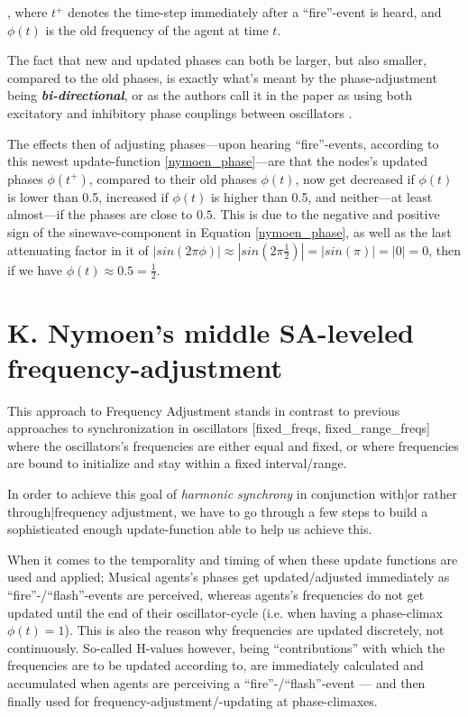 , where $t^+$ denotes the time-step immediately after a ``fire''-event is heard, and $\phi(t)$ is the old frequency of the agent at time $t$.

The fact that new and updated phases can both be larger, but also smaller, compared to the old phases, is exactly what's meant by the phase-adjustment being \textbf{\textit{bi-directional}}, or as the authors call it in the paper as using both excitatory and inhibitory phase couplings between oscillators \cite{nymoen_synch}.

The effects then of adjusting phases—upon hearing ``fire''-events, according to this newest update-function \eqref{nymoen_phase}—are that the nodes's updated phases $\phi(t^+)$, compared to their old phases $\phi(t)$, now get decreased if $\phi(t)$ is lower than 0.5, increased if $\phi(t)$ is higher than 0.5, and neither—at least almost—if the phases are close to $0.5$. This is due to the negative and positive sign of the sinewave-component in Equation \eqref{nymoen_phase}, as well as the last attenuating factor in it of $| sin(2\pi\phi) | \approx | sin(2\pi \frac{1}{2}) | = | sin(\pi) | = | 0 | = 0$, then if we have $\phi(t) \approx 0.5 = \frac{1}{2}$.





\section{K. Nymoen's middle SA-leveled frequency-adjustment}
\label{nymoen_freq_adjust}

This approach to Frequency Adjustment stands in contrast to previous approaches to synchronization in oscillators [fixed\_freqs, fixed\_range\_freqs] where the oscillators's frequencies are either equal and fixed, or where frequencies are bound to initialize and stay within a fixed interval/range.

In order to achieve this goal of \textit{harmonic synchrony} in conjunction with|or rather through|frequency adjustment, we have to go through a few steps to build a sophisticated enough update-function able to help us achieve this.

When it comes to the temporality and timing of when these update functions are used and applied; Musical agents's phases get updated/adjusted immediately as ``fire''-/``flash''-events are perceived, whereas agents's frequencies do not get updated until the end of their oscillator-cycle (i.e. when having a phase-climax $\phi(t)=1$). This is also the reason why frequencies are updated discretely, not continuously. So-called H-values however, being ``contributions'' with which the frequencies are to be updated according to, are immediately calculated and accumulated when agents are perceiving a ``fire''-/``flash''-event — and then finally used for frequency-adjustment/-updating at phase-climaxes.
		

